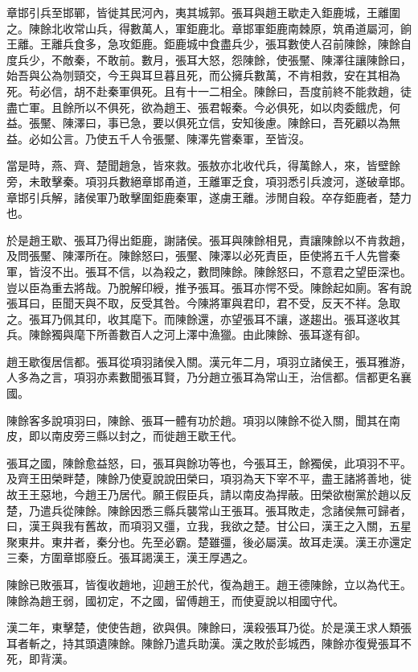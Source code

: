 章邯引兵至邯鄲，皆徙其民河內，夷其城郭。張耳與趙王歇走入鉅鹿城，王離圍之。陳餘北收常山兵，得數萬人，軍鉅鹿北。章邯軍鉅鹿南棘原，筑甬道屬河，餉王離。王離兵食多，急攻鉅鹿。鉅鹿城中食盡兵少，張耳數使人召前陳餘，陳餘自度兵少，不敵秦，不敢前。數月，張耳大怒，怨陳餘，使張黶、陳澤往讓陳餘曰，始吾與公為刎頸交，今王與耳旦暮且死，而公擁兵數萬，不肯相救，安在其相為死。茍必信，胡不赴秦軍俱死。且有十一二相全。陳餘曰，吾度前終不能救趙，徒盡亡軍。且餘所以不俱死，欲為趙王、張君報秦。今必俱死，如以肉委餓虎，何益。張黶、陳澤曰，事已急，要以俱死立信，安知後慮。陳餘曰，吾死顧以為無益。必如公言。乃使五千人令張黶、陳澤先嘗秦軍，至皆沒。

當是時，燕、齊、楚聞趙急，皆來救。張敖亦北收代兵，得萬餘人，來，皆壁餘旁，未敢擊秦。項羽兵數絕章邯甬道，王離軍乏食，項羽悉引兵渡河，遂破章邯。章邯引兵解，諸侯軍乃敢擊圍鉅鹿秦軍，遂虜王離。涉閒自殺。卒存鉅鹿者，楚力也。

於是趙王歇、張耳乃得出鉅鹿，謝諸侯。張耳與陳餘相見，責讓陳餘以不肯救趙，及問張黶、陳澤所在。陳餘怒曰，張黶、陳澤以必死責臣，臣使將五千人先嘗秦軍，皆沒不出。張耳不信，以為殺之，數問陳餘。陳餘怒曰，不意君之望臣深也。豈以臣為重去將哉。乃脫解印綬，推予張耳。張耳亦愕不受。陳餘起如廁。客有說張耳曰，臣聞天與不取，反受其咎。今陳將軍與君印，君不受，反天不祥。急取之。張耳乃佩其印，收其麾下。而陳餘還，亦望張耳不讓，遂趨出。張耳遂收其兵。陳餘獨與麾下所善數百人之河上澤中漁獵。由此陳餘、張耳遂有卻。

趙王歇復居信都。張耳從項羽諸侯入關。漢元年二月，項羽立諸侯王，張耳雅游，人多為之言，項羽亦素數聞張耳賢，乃分趙立張耳為常山王，治信都。信都更名襄國。

陳餘客多說項羽曰，陳餘、張耳一體有功於趙。項羽以陳餘不從入關，聞其在南皮，即以南皮旁三縣以封之，而徙趙王歇王代。

張耳之國，陳餘愈益怒，曰，張耳與餘功等也，今張耳王，餘獨侯，此項羽不平。及齊王田榮畔楚，陳餘乃使夏說說田榮曰，項羽為天下宰不平，盡王諸將善地，徙故王王惡地，今趙王乃居代。願王假臣兵，請以南皮為捍蔽。田榮欲樹黨於趙以反楚，乃遣兵從陳餘。陳餘因悉三縣兵襲常山王張耳。張耳敗走，念諸侯無可歸者，曰，漢王與我有舊故，而項羽又彊，立我，我欲之楚。甘公曰，漢王之入關，五星聚東井。東井者，秦分也。先至必霸。楚雖彊，後必屬漢。故耳走漢。漢王亦還定三秦，方圍章邯廢丘。張耳謁漢王，漢王厚遇之。

陳餘已敗張耳，皆復收趙地，迎趙王於代，復為趙王。趙王德陳餘，立以為代王。陳餘為趙王弱，國初定，不之國，留傅趙王，而使夏說以相國守代。

漢二年，東擊楚，使使告趙，欲與俱。陳餘曰，漢殺張耳乃從。於是漢王求人類張耳者斬之，持其頭遺陳餘。陳餘乃遣兵助漢。漢之敗於彭城西，陳餘亦復覺張耳不死，即背漢。

